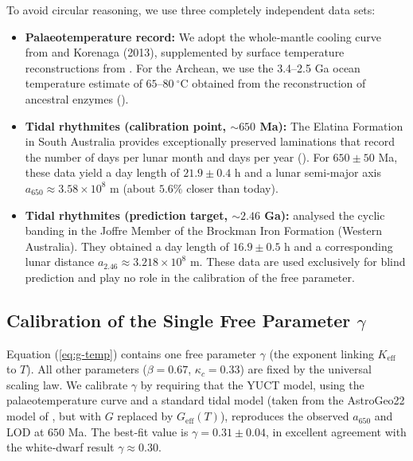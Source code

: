 \documentclass[12pt]{article}
\theoremstyle{remark}
\newcommand{\Keff}{K_{\mathrm{eff}}}
\newcommand{\kappac}{\kappa_c}
\begin{document}
	To avoid circular reasoning, we use three completely independent data sets:
	
	\begin{itemize}
		\item \textbf{Palaeotemperature record:} We adopt the whole‑mantle cooling curve from \cite{Herzberg2010} and Korenaga (2013), supplemented by surface temperature reconstructions from \cite{Scotese2021}. For the Archean, we use the 3.4–2.5 Ga ocean temperature estimate of $65$–$80\ \mathrm{^\circ C}$ obtained from the reconstruction of ancestral enzymes (\cite{Gaucher2008}).
		\item \textbf{Tidal rhythmites (calibration point, $\sim 650$ Ma):} The Elatina Formation in South Australia provides exceptionally preserved laminations that record the number of days per lunar month and days per year (\cite{Williams1989}). For $650\pm50$ Ma, these data yield a day length of $21.9\pm0.4$ h and a lunar semi‑major axis $a_{650} \approx 3.58\times10^8$ m (about $5.6\%$ closer than today).
		\item \textbf{Tidal rhythmites (prediction target, $\sim 2.46$ Ga):} \cite{Lantink2022} analysed the cyclic banding in the Joffre Member of the Brockman Iron Formation (Western Australia). They obtained a day length of $16.9\pm0.5$ h and a corresponding lunar distance $a_{2.46} \approx 3.218\times10^8$ m. These data are used exclusively for blind prediction and play no role in the calibration of the free parameter.
	\end{itemize}
	
	\subsection{Calibration of the Single Free Parameter $\gamma$}
	
	Equation (\ref{eq:g-temp}) contains one free parameter $\gamma$ (the exponent linking $\Keff$ to $T$). All other parameters ($\beta=0.67$, $\kappac=0.33$) are fixed by the universal scaling law. We calibrate $\gamma$ by requiring that the YUCT model, using the palaeotemperature curve and a standard tidal model (taken from the AstroGeo22 model of \cite{Farhat2022}, but with $G$ replaced by $G_{\mathrm{eff}}(T)$), reproduces the observed $a_{650}$ and LOD at $650$ Ma. The best‑fit value is $\gamma = 0.31 \pm 0.04$, in excellent agreement with the white‑dwarf result $\gamma\approx0.30$.
	\label{subsec:earth-moon-calibration}
	
\end{document}
